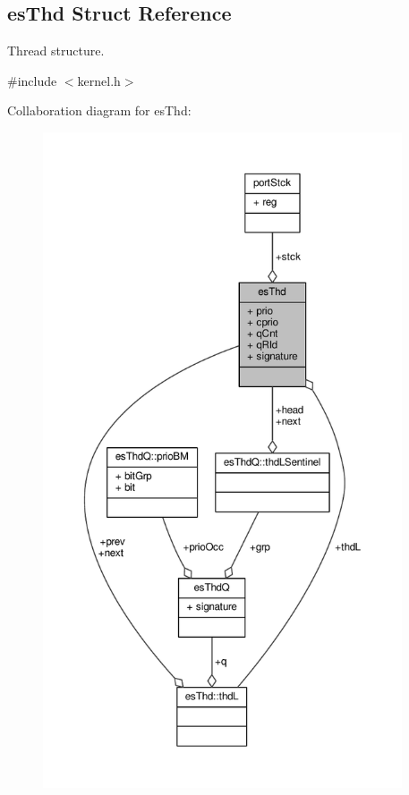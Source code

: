 \hypertarget{structesThd}{\subsection{es\-Thd Struct Reference}
\label{structesThd}
}


Thread structure.  




{\ttfamily \#include $<$kernel.\-h$>$}



Collaboration diagram for es\-Thd\-:\nopagebreak
\begin{figure}[H]
\begin{center}
\leavevmode
\includegraphics[height=550pt]{structesThd__coll__graph}
\end{center}
\end{figure}
